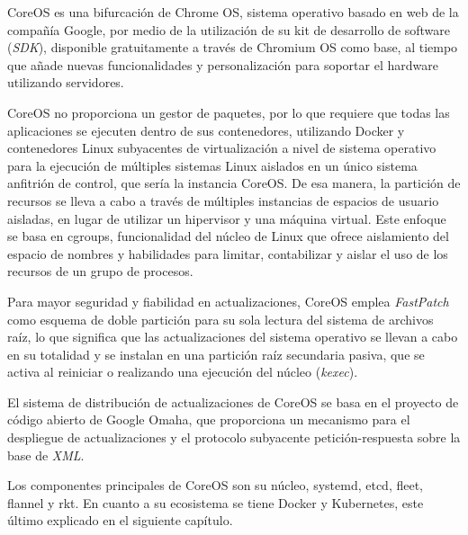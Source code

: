 CoreOS es una bifurcación de Chrome OS, sistema operativo basado en web de la compañía Google, por medio de la utilización de su kit de desarrollo de software (\textit{SDK}), disponible gratuitamente a través de Chromium OS como base, al tiempo que añade nuevas funcionalidades y personalización para soportar el hardware utilizando servidores.

CoreOS no proporciona un gestor de paquetes, por lo que requiere que todas las aplicaciones se ejecuten dentro de sus contenedores, utilizando Docker y contenedores Linux subyacentes de virtualización a nivel de sistema operativo para la ejecución de múltiples sistemas Linux aislados en un único sistema anfitrión de control, que sería la instancia CoreOS. De esa manera, la partición de recursos se lleva a cabo a través de múltiples instancias de espacios de usuario aisladas, en lugar de utilizar un hipervisor y una máquina virtual. Este enfoque se basa en cgroups, funcionalidad del núcleo de Linux que ofrece aislamiento del espacio de nombres y habilidades para limitar, contabilizar y aislar el uso de los recursos de un grupo de procesos.

Para mayor seguridad y fiabilidad en actualizaciones, CoreOS emplea \textit{FastPatch} como esquema de doble partición para su sola lectura del sistema de archivos raíz, lo que significa que las actualizaciones del sistema operativo se llevan a cabo en su totalidad y se instalan en una partición raíz secundaria pasiva, que se activa al reiniciar o realizando una ejecución del núcleo (\textit{kexec}).

El sistema de distribución de actualizaciones de CoreOS se basa en el proyecto de código abierto de Google Omaha, que proporciona un mecanismo para el despliegue de actualizaciones y el protocolo subyacente petición-respuesta sobre la base de \textit{XML}.

Los componentes principales de CoreOS son su núcleo, systemd, etcd, fleet, flannel y rkt. En cuanto a su ecosistema se tiene Docker y Kubernetes, este último explicado en el siguiente capítulo.

